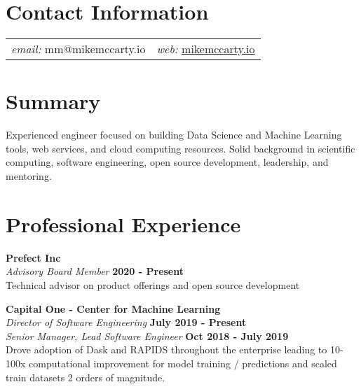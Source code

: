 \documentclass[margin,line]{res}
\begin{document}
\newcommand{\link}[1]{\texttt{#1}}
\providecommand{\tightlist}{%
      \setlength{\itemsep}{0pt}\setlength{\parskip}{0pt}}



\begin{resume}
\section{\sc Contact Information}
\vspace{.05in}
\begin{tabular}{@{}p{2in}p{4in}}
{\it email:}  mm@mikemccarty.io   & {\it web:} \href{http://mikemccarty.io}{mikemccarty.io} \\
\end{tabular}


\section{\sc Summary}
Experienced engineer focused on building Data Science and Machine Learning tools, web services, and cloud computing resources. Solid background in scientific computing, software engineering, open source development, leadership, and mentoring.

\section{\sc Professional Experience}

{\bf Prefect Inc} \\
{\em Advisory Board Member} \hfill {\bf 2020 - Present}\\
Technical advisor on product offerings and open source development

{\bf Capital One - Center for Machine Learning} \\
{\em Director of Software Engineering} \hfill {\bf July 2019 - Present}\\
{\em Senior Manager, Lead Software Engineer} \hfill {\bf Oct 2018 - July 2019}\\
Drove adoption of Dask and RAPIDS throughout the enterprise leading to
10-100x computational improvement for model training / predictions
and scaled train datasets 2 orders of magnitude.


\end{resume}
\end{document}
